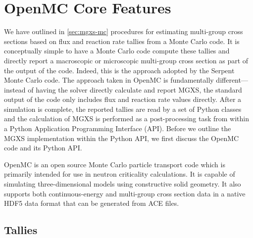 \section{OpenMC Core Features}
\label{sec:openmc}

We have outlined in \cref{sec:mgxs-mc} procedures for estimating multi-group cross sections based on flux and reaction rate tallies from a Monte Carlo code. It is conceptually simple to have a Monte Carlo code compute these tallies and directly report a macroscopic or microscopic multi-group cross section as part of the output of the code. Indeed, this is the approach adopted by the Serpent Monte Carlo code\cite{leppanen2016homog}. The approach taken in OpenMC is fundamentally different---instead of having the solver directly calculate and report MGXS, the standard output of the code only includes flux and reaction rate values directly. After a simulation is complete, the reported tallies are read by a set of Python classes and the calculation of MGXS is performed as a post-processing task from within a Python Application Programming Interface (API). Before we outline the MGXS implementation within the Python API, we first discuss the OpenMC code and its Python API.

OpenMC is an open source Monte Carlo particle transport code which is primarily intended for use in neutron criticality calculations. It is capable of simulating three-dimensional models using constructive solid geometry. It also supports both continuous-energy and multi-group cross section data in a native HDF5\cite{koranne2011hdf5} data format\cite{romano2017epjwoc} that can be generated from ACE files.

\subsection{Tallies}
\label{subsec:tallies}

